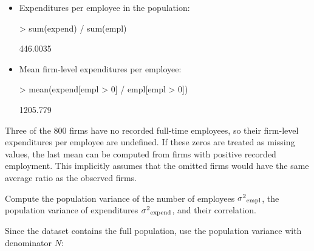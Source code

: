 \begin{Problem}
\begin{Subtask}
\begin{Solution}
\begin{itemize}
\begin{Schunk}
\begin{Sinput}
> mean(expend)
\end{Sinput}
\begin{Soutput}
[1] 85956.59
\end{Soutput}
\end{Schunk}

            \item Expenditures per employee in the population:

\begin{Schunk}
\begin{Sinput}
> sum(expend) / sum(empl)
\end{Sinput}
\begin{Soutput}
[1] 446.0035
\end{Soutput}
\end{Schunk}

            \item Mean firm-level expenditures per employee:

\begin{Schunk}
\begin{Sinput}
> mean(expend[empl > 0] / empl[empl > 0])
\end{Sinput}
\begin{Soutput}
[1] 1205.779
\end{Soutput}
\end{Schunk}
        \end{itemize}

        \begin{Remark}
            Three of the 800 firms have no recorded full-time employees, so
            their firm-level expenditures per employee are undefined. If these
            zeros are treated as missing values, the last mean can be computed
            from firms with positive recorded employment. This implicitly
            assumes that the omitted firms would have the same average ratio as
            the observed firms.
        \end{Remark}
    \end{Solution}

    \item Compute the population variance of the number of employees
        ${\sigma^2}_{\mathrm{empl}}$, the population variance of expenditures
        ${\sigma^2}_{\mathrm{expend}}$, and their correlation.

    \begin{Solution}
        Since the dataset contains the full population, use the population
        variance with denominator $N$:


\end{Solution}
\end{Subtask}
\end{Problem}
